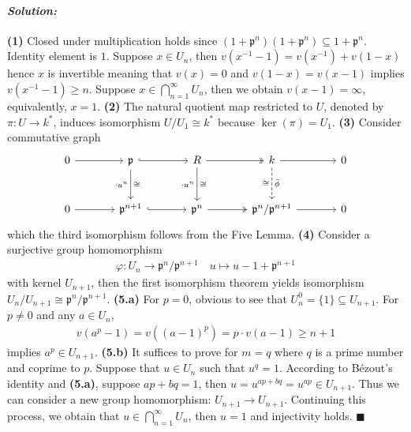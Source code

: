 \documentclass[12pt, a4paper]{article}
\newenvironment{solution}
  {\paragraph{\textit{Solution:}}\par\medskip}
  {\hfill$\blacksquare$\vspace{0.1cm}}
\begin{document}
\begin{solution}
    \textbf{(1)} Closed under multiplication holds since $(1 + \mathfrak{p}^n)(1 + \mathfrak{p}^n)\subseteq 1 + \mathfrak{p}^n$. 
    Identity element is $1$. Suppose $x\in U_n$, then $v(x^{-1}-1) = v(x^{-1})+v(1-x)$ hence $x$ is invertible meaning that $v(x)=0$ and 
    $v(1-x) = v(x-1)$ implies $v(x^{-1}-1)\ge n$. Suppose $x\in \bigcap_{n=1}^{\infty} U_n $, then we obtain $v(x-1) = \infty$, equivalently, $x=1$.
    \textbf{(2)} The natural quotient map restricted to $U$, denoted by $\pi:U\to k^*$, induces isomorphism $U/U_1 \cong k^*$ because $\ker(\pi) = U_1$.
    \textbf{(3)} Consider commutative graph 
\[
\begin{tikzcd}[row sep=large, column sep=large]
0 \arrow[r] & \mathfrak{p} \arrow[r, hook] \arrow[d, "\cdot u^n"', "\cong"] & R \arrow[r, two heads] \arrow[d, "\cdot u^n"', "\cong"] & k \arrow[r] \arrow[d, dashed, "\bar{\phi}", "\cong"'] & 0 \\
0 \arrow[r] & \mathfrak{p}^{n+1} \arrow[r, hook] & \mathfrak{p}^n \arrow[r, two heads] & \mathfrak{p}^n/\mathfrak{p}^{n+1} \arrow[r] & 0
\end{tikzcd}
\] 
which the third isomorphism follows from the Five Lemma.
\textbf{(4)} Consider a surjective group homomorphism 
\begin{align*}
    \varphi:U_n\to \mathfrak{p}^n/\mathfrak{p}^{n+1} \quad u\mapsto u-1 + \mathfrak{p}^{n+1}
\end{align*}
with kernel $U_{n+1}$, then the first isomorphism theorem yields isomorphism $U_n/U_{n+1} \cong \mathfrak{p}^n/\mathfrak{p}^{n+1}$.
\textbf{(5.a)} For $p=0$, obvious to see that $U_n^0=\{1\}\subseteq U_{n+1}$. For $p\neq 0$ and any $a\in U_n$, 
\begin{align*}
    v(a^p-1) =  v((a-1)^p) = p\cdot v(a-1)\ge n+1
\end{align*} 
implies $a^p\in U_{n+1}$.
\textbf{(5.b)} It suffices to prove for $m=q$ where $q$ is a prime number and coprime to $p$. Suppose that $u\in U_n$ such that $u^q =1$. 
According to Bézout's identity and \textbf{(5.a)}, suppose $ap+bq=1$, then $u = u^{ap+bq} = u^{ap}\in U_{n+1}$. Thus we can consider a new group homomorphism:
$U_{n+1} \to U_{n+1}$. Continuing this process, we obtain that $u\in \bigcap_{n=1}^{\infty} U_n$, then $u=1$ and injectivity holds.
\end{solution}
\end{document}
